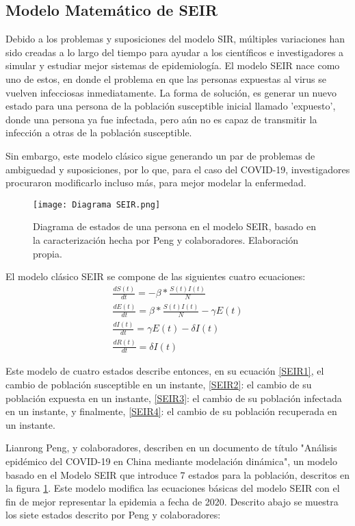 \subsection{Modelo Matemático de SEIR}
Debido a los problemas y suposiciones del modelo SIR, múltiples variaciones han sido creadas a lo largo del tiempo para ayudar a los científicos e investigadores a simular y estudiar mejor sistemas de epidemiología. El modelo SEIR nace como uno de estos, en donde el problema en que las personas expuestas al virus se vuelven infecciosas inmediatamente. La forma de solución, es generar un nuevo estado para una persona de la población susceptible inicial llamado 'expuesto', donde una persona ya fue infectada, pero aún no es capaz de transmitir la infección a otras de la población susceptible.

Sin embargo, este modelo clásico sigue generando un par de problemas de ambiguedad y suposiciones, por lo que, para el caso del COVID-19, investigadores procuraron modificarlo incluso más, para mejor modelar la enfermedad.

\begin{figure}
    \texttt{[image: Diagrama SEIR.png]}
    \caption{Diagrama de estados de una persona en el modelo SEIR, basado en la caracterización hecha por Peng y colaboradores. Elaboración propia.}
    \label{diagrama SEIR}
\end{figure}

El modelo clásico SEIR se compone de las siguientes cuatro ecuaciones:
\begin{eqnarray}
    \frac{dS(t)}{dt} = - \beta * \frac{S(t) I(t)}{N} \label{SEIR1}\\
    \frac{dE(t)}{dt} = \beta * \frac{S(t) I(t)}{N} - \gamma E(t) \label{SEIR2}\\
    \frac{dI(t)}{dt} = \gamma E(t) - \delta I(t) \label{SEIR3}\\
    \frac{dR(t)}{dt} = \delta I(t) \label{SEIR4}
\end{eqnarray}

Este modelo de cuatro estados describe entonces, en su ecuación \eqref{SEIR1}, el cambio de población susceptible en un instante, \eqref{SEIR2}: el cambio de su población expuesta en un instante, \eqref{SEIR3}: el cambio de su población infectada en un instante, y finalmente, \eqref{SEIR4}: el cambio de su población recuperada en un instante.

Lianrong Peng, y colaboradores, describen en un documento de título "Análisis epidémico del COVID-19 en China mediante modelación dinámica"\cite{https://doi.org/10.48550/arxiv.2002.06563}, un modelo basado en el Modelo SEIR que introduce 7 estados para la población, descritos en la figura \ref{diagrama SEIR}. Este modelo modifica las ecuaciones básicas del modelo SEIR con el fin de mejor representar la epidemia a fecha de 2020. Descrito abajo se muestra los siete estados descrito por Peng y colaboradores:

